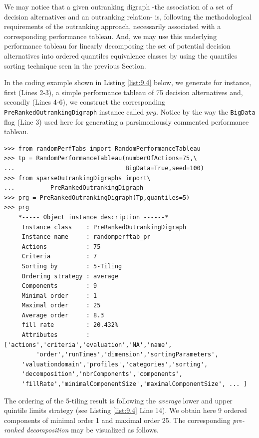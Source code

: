 We may notice that a given outranking digraph -the association of a set of decision alternatives and an outranking relation- is, following the methodological requirements of the outranking approach, necessarily associated with a corresponding performance tableau. And, we may use this underlying performance tableau for linearly decomposing the set of potential decision alternatives into ordered quantiles equivalence classes by using the quantiles sorting technique seen in the previous Section. 

In the coding example shown in Listing \ref{list:9.4} below, we generate for instance, first (Lines 2-3), a simple performance tableau of 75 decision alternatives and, secondly (Lines 4-6), we construct the corresponding \texttt{PreRankedOutrankingDigraph} instance called $prg$. Notice by the way the \texttt{BigData} flag (Line 3) used here for generating a parsimoniously commented performance tableau.

\begin{lstlisting}[caption={Computing a \emph{pre-ranked} sparse outranking digraph},label=list:9.4]
>>> from randomPerfTabs import RandomPerformanceTableau
>>> tp = RandomPerformanceTableau(numberOfActions=75,\
...                               BigData=True,seed=100)
>>> from sparseOutrankingDigraphs import\
...          PreRankedOutrankingDigraph
>>> prg = PreRankedOutrankingDigraph(Tp,quantiles=5)
>>> prg
    *----- Object instance description ------*
     Instance class    : PreRankedOutrankingDigraph
     Instance name     : randomperftab_pr
     Actions           : 75
     Criteria          : 7
     Sorting by        : 5-Tiling
     Ordering strategy : average
     Components        : 9
     Minimal order     : 1
     Maximal order     : 25
     Average order     : 8.3
     fill rate         : 20.432%
     Attributes        : ['actions','criteria','evaluation','NA','name',
         'order','runTimes','dimension','sortingParameters',
	 'valuationdomain','profiles','categories','sorting',
	 'decomposition','nbrComponents','components',
	 'fillRate','minimalComponentSize','maximalComponentSize', ... ]
\end{lstlisting}

The ordering of the 5-tiling result is following the \emph{average} lower and upper quintile limits strategy (see Listing \ref{list:9.4} Line 14). We obtain here 9 ordered components of minimal order 1 and maximal order 25. The corresponding \emph{pre-ranked decomposition} may be visualized as follows.

